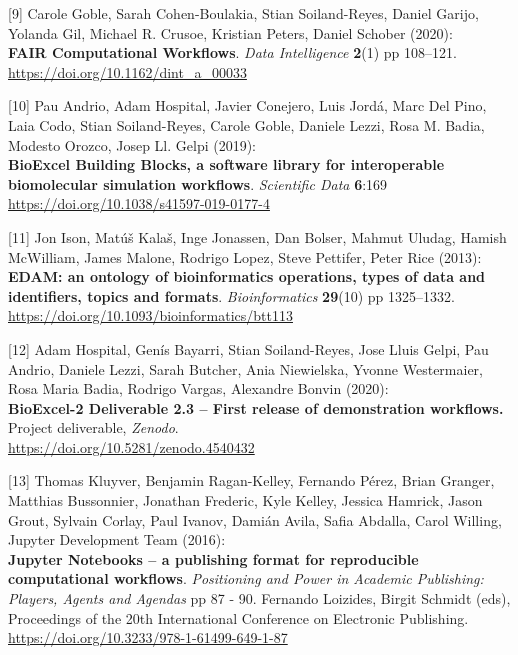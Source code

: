 {[}9{]} Carole Goble, Sarah Cohen-Boulakia, Stian Soiland-Reyes, Daniel
Garijo, Yolanda Gil, Michael R. Crusoe, Kristian Peters, Daniel Schober
(2020):\\
\textbf{FAIR Computational Workflows}. \emph{Data Intelligence}
\textbf{2}(1) pp 108--121.\\
\url{https://doi.org/10.1162/dint_a_00033}

{[}10{]} Pau Andrio, Adam Hospital, Javier Conejero, Luis Jordá, Marc
Del Pino, Laia Codo, Stian Soiland-Reyes, Carole Goble, Daniele Lezzi,
Rosa M. Badia, Modesto Orozco, Josep Ll. Gelpi (2019):\\
\textbf{BioExcel Building Blocks, a software library for interoperable
biomolecular simulation workflows}. \emph{Scientific Data}
\textbf{6}:169\\
\url{https://doi.org/10.1038/s41597-019-0177-4}

{[}11{]} Jon Ison, Matúš Kalaš, Inge Jonassen, Dan Bolser, Mahmut
Uludag, Hamish McWilliam, James Malone, Rodrigo Lopez, Steve Pettifer,
Peter Rice (2013):\\
\textbf{EDAM: an ontology of bioinformatics operations, types of data
and identifiers, topics and formats}. \emph{Bioinformatics}
\textbf{29}(10) pp 1325--1332.\\
\url{https://doi.org/10.1093/bioinformatics/btt113}

{[}12{]} Adam Hospital, Genís Bayarri, Stian Soiland-Reyes, Jose Lluis
Gelpi, Pau Andrio, Daniele Lezzi, Sarah Butcher, Ania Niewielska, Yvonne
Westermaier, Rosa Maria Badia, Rodrigo Vargas, Alexandre Bonvin
(2020):\\
\textbf{BioExcel-2 Deliverable 2.3 -- First release of demonstration
workflows.} Project deliverable, \emph{Zenodo}.\\
\url{https://doi.org/10.5281/zenodo.4540432}

{[}13{]} Thomas Kluyver, Benjamin Ragan-Kelley, Fernando Pérez, Brian
Granger, Matthias Bussonnier, Jonathan Frederic, Kyle Kelley, Jessica
Hamrick, Jason Grout, Sylvain Corlay, Paul Ivanov, Damián Avila, Safia
Abdalla, Carol Willing, Jupyter Development Team (2016):\\
\textbf{Jupyter Notebooks -- a publishing format for reproducible
computational workflows}. \emph{Positioning and Power in Academic
Publishing: Players, Agents and Agendas} pp 87 - 90. Fernando Loizides,
Birgit Schmidt (eds), Proceedings of the 20th International Conference
on Electronic Publishing.\\
\url{https://doi.org/10.3233/978-1-61499-649-1-87}

